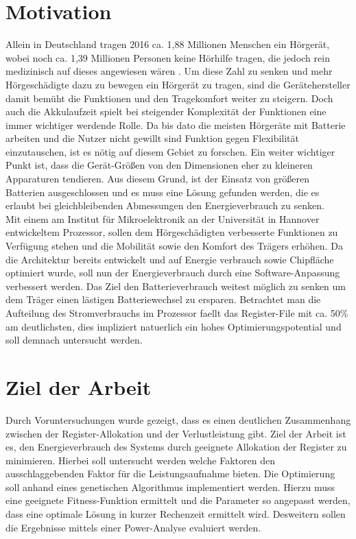 \section{Motivation}
\label{sec:motivation}
Allein in Deutschland tragen 2016 ca. 1,88 Millionen Menschen ein Hörgerät, wobei noch ca. 1,39 Millionen Personen keine Hörhilfe tragen, die jedoch rein medizinisch auf dieses angewiesen wären \cite{statistica}. Um diese Zahl zu senken und mehr Hörgeschädigte dazu zu bewegen ein Hörgerät zu tragen, sind die Gerätehersteller damit bemüht die Funktionen und den Tragekomfort weiter zu steigern. Doch auch die Akkulaufzeit spielt bei steigender Komplexität der Funktionen eine immer wichtiger werdende Rolle. Da bis dato die meisten Hörgeräte mit Batterie arbeiten und die Nutzer nicht gewillt sind Funktion gegen Flexibilität einzutauschen, ist es nötig auf diesem Gebiet zu forschen. Ein weiter wichtiger Punkt ist, dass die Gerät-Größen von den Dimensionen eher zu kleineren Apparaturen tendieren. Aus diesem Grund, ist der Einsatz von größeren Batterien ausgeschlossen und es muss eine Lösung gefunden werden, die es erlaubt bei gleichbleibenden Abmessungen den Energieverbrauch zu senken.\\
Mit einem am Institut für Mikroelektronik an der Universität in Hannover entwickeltem Prozessor, sollen dem Hörgeschädigten verbesserte Funktionen zu Verfügung stehen und die Mobilität sowie den Komfort des Trägers erhöhen. Da die Architektur bereits entwickelt und auf Energie verbrauch sowie Chipfläche optimiert wurde, soll nun der Energieverbrauch durch eine Software-Anpassung verbessert werden.
Das Ziel den Batterieverbrauch weitest möglich zu senken um dem Träger einen lästigen Batteriewechsel zu ersparen.
Betrachtet man die Aufteilung des Stromverbrauchs im Prozessor faellt das Register-File mit ca. 50\% am deutlichsten, dies impliziert natuerlich ein hohes Optimierungspotential und soll demnach untersucht werden.



\section{Ziel der Arbeit}
\label{sec:ziele}
Durch Voruntersuchungen wurde gezeigt, dass es einen deutlichen Zusammenhang zwischen der Register-Allokation und der Verlustleistung gibt. Ziel der Arbeit ist es, den Energieverbrauch des Systems durch geeignete Allokation der Register zu minimieren. Hierbei soll untersucht werden welche Faktoren den ausschlaggebenden Faktor für die Leistungsaufnahme bieten. Die Optimierung soll anhand eines genetischen Algorithmus implementiert werden. Hierzu muss eine geeignete Fitness-Funktion ermittelt und die Parameter so angepasst werden, dass eine optimale Lösung in kurzer Rechenzeit ermittelt wird. Desweitern sollen die Ergebnisse mittels einer Power-Analyse evaluiert werden.

